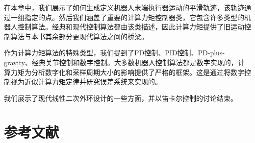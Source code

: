 \documentclass[UTF8]{ctexart}
\theoremstyle{definition}
\begin{document}
在本章中，我们展示了如何生成定义机器人末端执行器运动的平滑轨迹，该轨迹通过一组指定的点。然后我们涵盖了重要的计算力矩控制器类，它包含许多类型的机器人控制算法。经典和现代控制算法都由该类描述，因此计算力矩提供了旧运动控制算法与本书其余部分更现代算法之间的桥梁。

作为计算力矩算法的特殊类型，我们提到了PD控制、PID控制、PD-plus-gravity、经典关节控制和数字控制。大多数机器人控制算法都是数字实现的，计算力矩为分析数字化和采样周期大小的影响提供了严格的框架。这是通过将数字控制视为近似计算力矩定律并研究误差系统来实现的。

我们展示了现代线性二次外环设计的一些方面，并以笛卡尔控制的讨论结束。

\newpage
\section*{参考文献}
\end{document}
